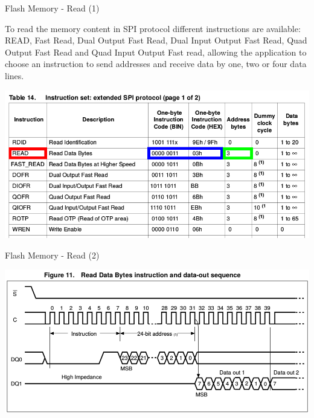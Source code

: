 \documentclass[ignorenonframetext,aspectratio=43,]{beamer}
\begin{document}
\begin{frame}{Flash Memory - Read (1)}
\protect\hypertarget{flash-memory---read-1}{}

To read the memory content in SPI protocol different instructions are
available: READ, Fast Read, Dual Output Fast Read, Dual Input Output
Fast Read, Quad Output Fast Read and Quad Input Output Fast read,
allowing the application to choose an instruction to send addresses and
receive data by one, two or four data lines.

\includegraphics[width=1\textwidth,height=\textheight]{images/table}

\end{frame}

\begin{frame}{Flash Memory - Read (2)}
\protect\hypertarget{flash-memory---read-2}{}

\includegraphics[width=1\textwidth,height=\textheight]{images/read}

\end{frame}
\end{document}
